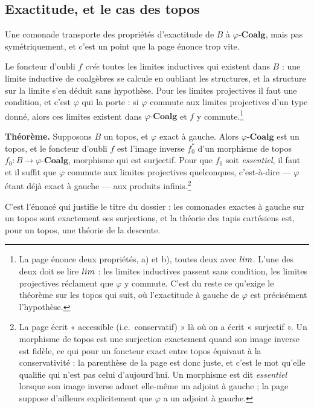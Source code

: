 \documentclass[11pt,a4paper]{article}
\begin{document}
\subsection*{Exactitude, et le cas des topos}

Une comonade transporte des propriétés d'exactitude de $B$ à
$\varphi\text{-}\mathbf{Coalg}$, mais pas symétriquement, et c'est un point que
la page énonce trop vite.

Le foncteur d'oubli $f$ \emph{crée} toutes les limites inductives qui existent
dans $B$ : une limite inductive de coalgèbres se calcule en oubliant les
structures, et la structure sur la limite s'en déduit sans hypothèse. Pour les
limites projectives il faut une condition, et c'est $\varphi$ qui la porte :
si $\varphi$ commute aux limites projectives d'un type donné, alors ces
limites existent dans $\varphi\text{-}\mathbf{Coalg}$ et $f$ y
commute.\footnote{La page énonce deux propriétés, a) et b), toutes deux avec
$\varprojlim$. L'une des deux doit se lire $\varinjlim$ : les limites
inductives passent sans condition, les limites projectives réclament que
$\varphi$ y commute. C'est du reste ce qu'exige le théorème sur les topos qui
suit, où l'exactitude à gauche de $\varphi$ est précisément l'hypothèse.}

\textbf{Théorème.} Supposons $B$ un topos, et $\varphi$ exact à gauche. Alors
$\varphi\text{-}\mathbf{Coalg}$ est un topos, et le foncteur d'oubli $f$ est
l'image inverse $f_{0}^{*}$ d'un morphisme de topos
$f_{0} : B \to \varphi\text{-}\mathbf{Coalg}$, morphisme qui est surjectif.
Pour que $f_{0}$ soit \emph{essentiel}, il faut et il suffit que $\varphi$
commute aux limites projectives quelconques, c'est-à-dire — $\varphi$ étant
déjà exact à gauche — aux produits infinis.\footnote{La page écrit
« accessible (i.e.\ conservatif) » là où on a écrit « surjectif ». Un morphisme
de topos est une surjection exactement quand son image inverse est fidèle, ce
qui pour un foncteur exact entre topos équivaut à la conservativité : la
parenthèse de la page est donc juste, et c'est le mot qu'elle qualifie qui
n'est pas celui d'aujourd'hui. Un morphisme est dit \emph{essentiel} lorsque
son image inverse admet elle-même un adjoint à gauche ; la page suppose
d'ailleurs explicitement que $\varphi$ a un adjoint à gauche.}

C'est l'énoncé qui justifie le titre du dossier : les comonades exactes à
gauche sur un topos sont exactement ses surjections, et la théorie des tapis
cartésiens est, pour un topos, une théorie de la descente.
\end{document}
